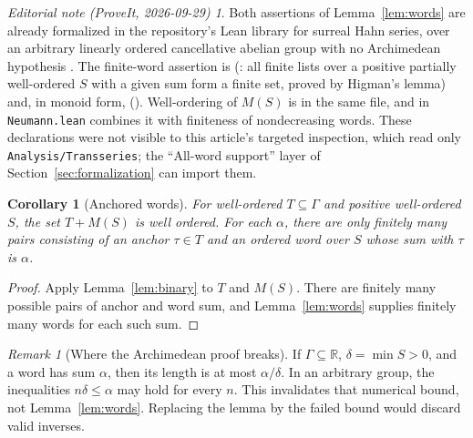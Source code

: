 \documentclass[11pt,a4paper]{article}
\newtheorem{corollary}[theorem]{Corollary}
\theoremstyle{definition}
\theoremstyle{remark}
\newtheorem{remark}[theorem]{Remark}
\newtheorem*{ednote}{Editorial note (ProveIt, 2026-09-29)}
\newcommand{\R}{\mathbb R}
\begin{document}
\begin{ednote}\label{ed:words-lean}
Both assertions of Lemma~\ref{lem:words} are already formalized in the
repository's Lean library for surreal Hahn series, over an arbitrary
linearly ordered cancellative abelian group with no Archimedean
hypothesis \cite{EdSurrealLean}. The finite-word assertion is
(: all
finite lists over a positive partially well-ordered $S$ with a given sum
form a finite set, proved by Higman's lemma) and, in monoid form,
().
Well-ordering of $M(S)$ is
 in the same file, and
 in \texttt{Neumann.lean}
combines it with finiteness of nondecreasing words. These declarations
were not visible to this article's targeted inspection, which read only
\texttt{Analysis/Transseries}; the ``All-word support'' layer of
Section~\ref{sec:formalization} can import them.
\end{ednote}

\begin{corollary}[Anchored words]\label{cor:anchored}
For well-ordered $T\subseteq\Gamma$ and positive well-ordered $S$, the set
$T+M(S)$ is well ordered. For each $\alpha$, there are only finitely many
pairs consisting of an anchor $\tau\in T$ and an ordered word over $S$
whose sum with $\tau$ is $\alpha$.
\end{corollary}
\begin{proof}
Apply Lemma~\ref{lem:binary} to $T$ and $M(S)$. There are finitely many
possible pairs of anchor and word sum, and Lemma~\ref{lem:words} supplies
finitely many words for each such sum.
\end{proof}

\begin{remark}[Where the Archimedean proof breaks]\label{rem:archbreak}
If $\Gamma\subseteq\R$, $\delta=\min S>0$, and a word has sum $\alpha$, then
its length is at most $\alpha/\delta$. In an arbitrary group, the inequalities
$n\delta\le\alpha$ may hold for every $n$. This invalidates that numerical
bound, not Lemma~\ref{lem:words}. Replacing the lemma by the failed bound
would discard valid inverses.
\end{remark}
\end{document}
